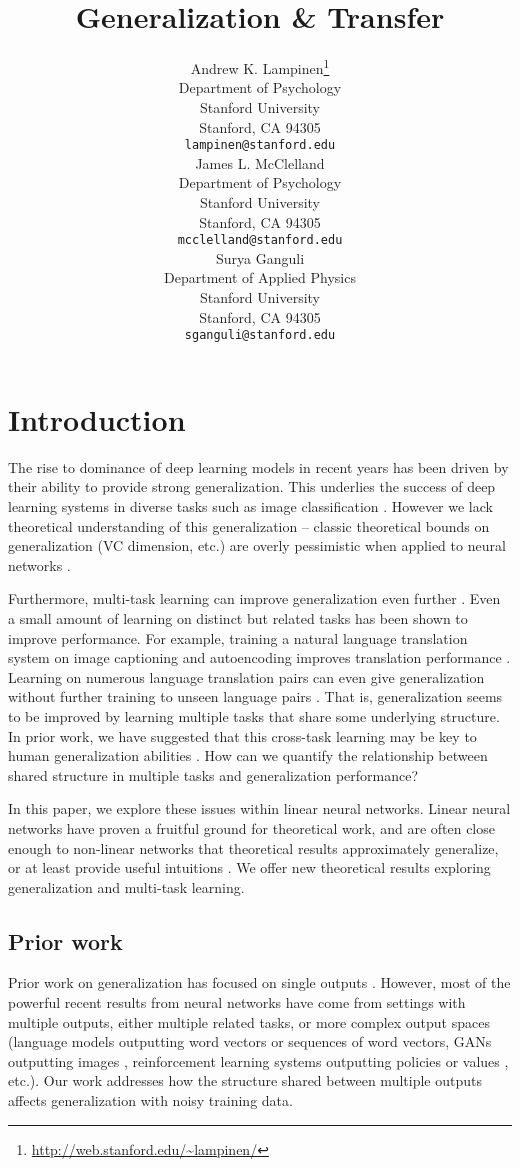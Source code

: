 \documentclass{article}
\title{Generalization \& Transfer}
\author{
  Andrew K. Lampinen\thanks{\url{http://web.stanford.edu/~lampinen/}} \\
  Department of Psychology\\
  Stanford University \\
  Stanford, CA 94305 \\
  \texttt{lampinen@stanford.edu} \\
  \And
  James L. McClelland \\
  Department of Psychology\\
  Stanford University \\
  Stanford, CA 94305 \\
  \texttt{mcclelland@stanford.edu} \\
  \And
  Surya Ganguli \\
  Department of Applied Physics\\
  Stanford University \\
  Stanford, CA 94305 \\
  \texttt{sganguli@stanford.edu} \\
}
\begin{document}

\maketitle

\begin{abstract}
\end{abstract}

\section{Introduction}

The rise to dominance of deep learning models in recent years has been driven by their ability to provide strong generalization. This underlies the success of deep learning systems in diverse tasks such as image classification \cite{}. However we lack theoretical understanding of this generalization -- classic theoretical bounds on generalization (VC dimension, etc.) are overly pessimistic when applied to neural networks \citep{Zhang2016, Advani2017}. \par 
Furthermore, multi-task learning can improve generalization even further \cite[e.g.]{Dong2015,Rusu2015}. Even a small amount of learning on distinct but related tasks has been shown to improve performance. For example, training a natural language translation system on image captioning and autoencoding improves translation performance \citep{Luong2016}. Learning on numerous language translation pairs can even give generalization without further training to unseen language pairs \citep{Johnson2016a}. That is, generalization seems to be improved by learning multiple tasks that share some underlying structure. In prior work, we have suggested that this cross-task learning may be key to human generalization abilities \citep{Hansen2017, Lampinen2017a}. How can we quantify the relationship between shared structure in multiple tasks and generalization performance? \par 
In this paper, we explore these issues within linear neural networks. Linear neural networks have proven a fruitful ground for theoretical work, and are often close enough to non-linear networks that theoretical results approximately generalize, or at least provide useful intuitions \cite[e.g.]{Saxe2013, Advani2017}. We offer new theoretical results exploring generalization and multi-task learning. \par
\subsection{Prior work}
Prior work on generalization has focused on single outputs \cite[e.g.]{Advani2017}. However, most of the powerful recent results from neural networks have come from settings with multiple outputs, either multiple related tasks, or more complex output spaces (language models outputting word vectors or sequences of word vectors, GANs outputting images \cite{Goodfellow2014}, reinforcement learning systems outputting policies or values \cite{Mnih2015, Silver2016}, etc.). Our work addresses how the structure shared between multiple outputs affects generalization with noisy training data. \par 
\end{document}
